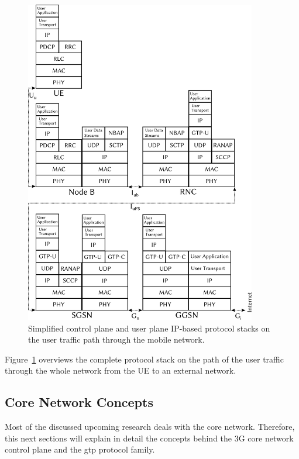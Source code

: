 \begin{figure}[htbp]
	\centering
	\includegraphics[width=0.9\textwidth]{images/umts-userpath-stack.pdf}
	\caption{Simplified control plane and user plane \acrshort{IP}-based protocol stacks on the user traffic path through the mobile network.}
\label{c4:fig:protocolstacks}
\end{figure}

Figure~\ref{c4:fig:protocolstacks} overviews the complete protocol stack on the path of the user traffic through the whole network from the \gls{UE} to an external network.


\subsection{Core Network Concepts}

Most of the discussed upcoming research deals with the core network. Therefore, this next sections will explain in detail the concepts behind the \gls{3G} core network control plane and the \gls{gtp} protocol family.

